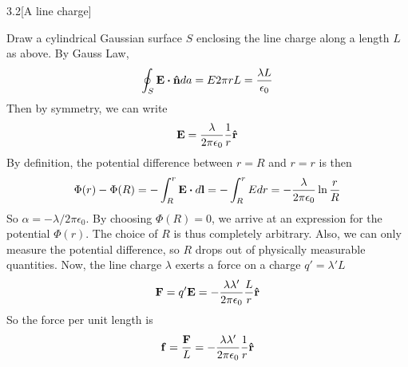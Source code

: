 \documentclass[12pt]{article}
\begin{document}
\begin{problem}{3.2}[A line charge]
\begin{solution}
Draw a cylindrical Gaussian surface $S$ enclosing the line charge along a
length $L$ as above. By Gauss Law,
\begin{equation}
    \oint_S\vb{E}\vdot\nhat da=E2\pi rL=\frac{\lambda L}{\epsilon_0} 
\end{equation}
Then by symmetry, we can write
\begin{equation}
    \vb{E}=\frac{\lambda}{2\pi\epsilon_0}\frac{1}{r}\vb{\hat{r}} 
\end{equation}
By definition, the potential difference between $r=R$ and $r=r$ is then
\begin{equation}
    \Phi(r)-\Phi(R)=-\int_R^r\vb{E}\vdot
    d\vb{l}=-\int_R^rEdr=-\frac{\lambda}{2\pi\epsilon_0}\ln\frac{r}{R}
\end{equation}
So $\alpha=-\lambda/2\pi\epsilon_0$. By choosing $\Phi(R)=0$, we arrive at an expression for the potential 
$\Phi(r)$. The choice of $R$ is thus completely arbitrary. Also, we can only
measure the potential difference, so $R$ drops out of physically measurable
quantities. Now, the line charge $\lambda$ exerts a force on a charge
$q'=\lambda' L$
\begin{equation}
    \vb{F}=q'\vb{E}=-\frac{\lambda\lambda'}{2\pi\epsilon_0}\frac{L}{r}\vb{\hat{r}} 
\end{equation}
So the force per unit length is
\begin{equation}
    \vb{f}=\frac{\vb{F}}{L}=-\frac{\lambda\lambda'}{2\pi\epsilon_0}\frac1{r}\vb{\hat{r}}
\end{equation}
\end{solution}
\end{problem}
\end{document}
